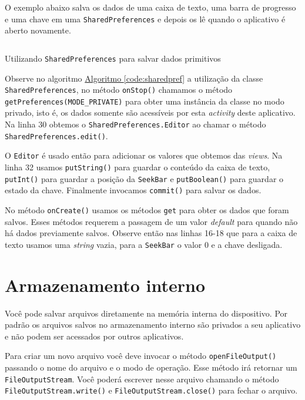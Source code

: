 \documentclass[a4paper,12pt,brazil,oneside]{book}
\begin{document}
\begin{singlespace}
		O exemplo abaixo salva os dados de uma caixa de texto, uma barra de progresso e uma chave em uma \texttt{SharedPreferences} e depois os lê quando o aplicativo é aberto novamente.

		\begin{listing}[H]
		\inputminted[linenos=true,fontsize=\small,frame=lines, framesep=2mm, tabsize=2,numbersep=5pt]{java}{src/api/storage/sharedpref.java}
		\caption{Utilizando \texttt{SharedPreferences} para salvar dados primitivos}
		\label{code:sharedpref}
		\end{listing} 	
		
		Observe no algoritmo \hyperref[code:sharedpref]{Algoritmo \ref*{code:sharedpref}} a utilização da classe \texttt{SharedPreferences}, no método \texttt{onStop()} chamamos o método \texttt{getPreferences(MODE\_PRIVATE)} para obter uma instância da classe no modo privado, isto é, os dados somente são acessíveis por esta \emph{activity} deste aplicativo. Na linha 30 obtemos o \texttt{SharedPreferences.Editor} ao chamar o método \texttt{SharedPreferences.edit()}.
		
		O \texttt{Editor} é usado então para adicionar os valores que obtemos das \emph{views}. Na linha 32 usamos \texttt{putString()} para guardar o conteúdo da caixa de texto,
\texttt{putInt()} para guardar a posição da \texttt{SeekBar} e \texttt{putBoolean()} para guardar o estado da chave. Finalmente invocamos \texttt{commit()} para salvar os dados.

		No método \texttt{onCreate()} usamos os métodos \texttt{get} para obter os dados que foram salvos. Esses métodos requerem a passagem de um valor \emph{default} para quando não há dados previamente salvos. Observe então nas linhas 16-18 que para a caixa de texto usamos uma \emph{string} vazia, para a \texttt{SeekBar} o valor 0 e a chave desligada.


		\section{Armazenamento interno}

		Você pode salvar arquivos diretamente na memória interna do dispositivo. Por padrão os arquivos salvos no armazenamento interno são privados a seu aplicativo e não podem ser acessados por outros aplicativos. 

		Para criar um novo arquivo você deve invocar o método \texttt{openFileOutput()} passando o nome do arquivo e o modo de operação. Esse método irá retornar um \texttt{FileOutputStream}. Você poderá escrever nesse arquivo chamando o método \texttt{FileOutputStream.write()} e \texttt{FileOutputStream.close()} para fechar o arquivo.


\end{singlespace}
\end{document}
